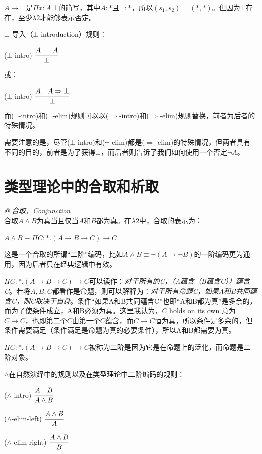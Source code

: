 \documentclass[UTF8]{article}
\makeatletter
\newcommand{\Rmnum}[1]{\expandafter\@slowromancap\romannumeral #1@}
\makeatother
\begin{document}
		$A\rightarrow\bot$是$\Pi x:A.\bot$的简写，其中$A:*$且$\bot:*$，所以$(s_1,s_2)=(*,*)$。但因为$\bot$存在，至少$\lambda{2}$才能够表示否定。
		
		$\bot$-导入（$\bot$-introduction）规则：
		
		($\bot$-intro) $\cfrac{A\ \ \ \neg A}{\bot}$
		
		或：
		
		($\bot$-intro) $\cfrac{A\ \ \ A\Rightarrow\bot}{\bot}$
		
		而($\neg$-intro)和($\neg$-elim)规则可以以($\Rightarrow$-intro)和($\Rightarrow$-elim)规则替换，前者为后者的特殊情况。
		
		需要注意的是，尽管($\bot$-intro)和($\neg$-elim)都是($\Rightarrow$-elim)的特殊情况，但两者具有不同的目的，前者是为了获得$\bot$，而后者则告诉了我们如何使用一个否定$\neg A$。
		
	\section{类型理论中的合取和析取}
	\noindent
	\textit{\Rmnum{1}.合取，Conjunction}\\
	合取$A\land B$为真当且仅当$A$和$B$都为真。在$\lambda{2}$中，合取的表示为：
	
		$A\land B\equiv\Pi C:*.(A\rightarrow B\rightarrow C)\rightarrow C$
		
		这是一个合取的所谓“二阶”编码，比如$A\land B\equiv\neg(A\rightarrow\neg B)$的一阶编码更为通用，因为后者只在经典逻辑中有效。
		
		$\Pi C:*.(A\rightarrow B\rightarrow C)\rightarrow C$可以读作：\textit{对于所有的C，（A蕴含（B蕴含C））蕴含C}。若将$A,B,C$都看作是命题，则可以解释为：\textit{对于所有命题C，如果A和B共同蕴含C，则C取决于自身}。条件“如果A和B共同蕴含C”也即“A和B都为真”是多余的，而为了使条件成立，A和B必须为真。这里我认为，$C$ holds on its own 意为 $C\rightarrow C$，也即第二个$C$由第一个$C$蕴含，而$C\rightarrow C$恒为真，所以条件是多余的，但条件需要满足（条件满足是命题为真的必要条件），所以A和B都需要为真。
		
		$\Pi C:*.(A\rightarrow B\rightarrow C)\rightarrow C$被称为二阶是因为它是在命题上的泛化，而命题是二阶对象。
		
		$\land$在自然演绎中的规则以及在类型理论中二阶编码的规则：
		
		($\land$-intro) $\cfrac{A\ \ \ B}{A\land B}$
		
		($\land$-elim-left) $\cfrac{A\land B}{A}$
		
		($\land$-elim-right) $\cfrac{A\land B}{B}$
		
\end{document}
